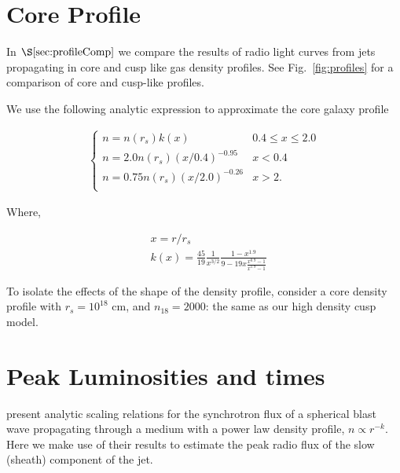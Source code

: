 \documentclass[usenatbib,fleqn]{mnras}
\begin{document}
\appendix
\section{Core Profile}
\label{app:core}
In $\S\ref{sec:profileComp}$ we compare the results of radio
light curves from jets propagating in core and cusp like gas density
profiles. See Fig.~\ref{fig:profiles} for a comparison of core and
cusp-like profiles. 

We use the following analytic expression to approximate the core
galaxy profile

\begin{align}
\begin{cases}
n=n(r_s) k(x) & 0.4 \leq x\leq 2.0\\
n = 2.0 n(r_s) (x/0.4)^{-0.95} & x < 0.4\\
n = 0.75 n(r_s) (x/2.0)^{-0.26} & x>2.\\
\end{cases}
\label{eq:cores}
\end{align}

Where, 

\begin{align}
  &x=r/r_s\\\nonumber
  &k(x)=\frac{45}{19} \frac{1}{x^{3/2}} \frac{1-x^{1.9}}{9-19
      x\frac{x^{0.9}-1}{x^{1.9}-1}}
\end{align}

To isolate the effects of the shape of the density profile, consider a
core density profile with $r_s=10^{18}$ cm, and $n_{18}=2000$: the
same as our high density cusp model.

\section{Peak Luminosities and times}
\label{app:analyt}
\citet{Leventis+2012} present analytic scaling relations for the synchrotron flux of a spherical blast wave propagating through a medium with a power law density profile, $n\propto r^{-k}$.  Here we make use of their results to estimate the peak radio flux of the slow (sheath) component of the jet.
\end{document}
